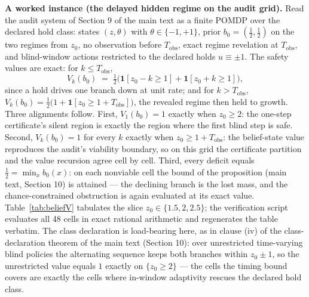 \documentclass[11pt]{article}
\theoremstyle{definition}
\begin{document}
\textbf{A worked instance (the delayed hidden regime on the audit grid).} Read the audit system of Section 9 of the main text as a finite POMDP over the declared hold class: states \((z,\theta)\) with \(\theta \in \{-1,+1\}\), prior \(b_{0} = (\tfrac{1}{2}, \tfrac{1}{2})\) on the two regimes from \(z_{0}\), no observation before \(T_{\mathrm{obs}}\), exact regime revelation at \(T_{\mathrm{obs}}\), and blind-window actions restricted to the declared holds \(u \equiv \pm 1\). The safety values are exact: for \(k \le T_{\mathrm{obs}}\),
\[
V_{k}(b_{0}) \;=\; \tfrac{1}{2}\bigl(\mathbf{1}[z_{0} - k \ge 1] + \mathbf{1}[z_{0} + k \ge 1]\bigr),
\]
since a hold drives one branch down at unit rate; and for \(k > T_{\mathrm{obs}}\),
\(V_{k}(b_{0}) = \tfrac{1}{2}\bigl(1 + \mathbf{1}[z_{0} \ge 1 + T_{\mathrm{obs}}]\bigr)\), the revealed regime then held to growth. Three alignments follow. First, \(V_{1}(b_{0}) = 1\) exactly when \(z_{0} \ge 2\): the one-step certificate's silent region is exactly the region where the first blind step is safe. Second, \(V_{k}(b_{0}) = 1\) for every \(k\) exactly when \(z_{0} \ge 1 + T_{\mathrm{obs}}\): the belief-state value reproduces the audit's viability boundary, so on this grid the certificate partition and the value recursion agree cell by cell. Third, every deficit equals \(\tfrac{1}{2} = \min_{x} b_{0}(x)\): on each nonviable cell the bound of the proposition (main text, Section 10) is attained --- the declining branch is the lost mass, and the chance-constrained obstruction is again evaluated at its exact value. Table~\ref{tab:beliefV} tabulates the slice \(z_{0} \in \{1.5, 2, 2.5\}\); the verification script evaluates all 48 cells in exact rational arithmetic and regenerates the table verbatim. The class declaration is load-bearing here, as in clause (iv) of the class-declaration theorem of the main text (Section 10): over unrestricted time-varying blind policies the alternating sequence keeps both branches within \(z_{0} \pm 1\), so the unrestricted value equals \(1\) exactly on \(\{z_{0} \ge 2\}\) --- the cells the timing bound covers are exactly the cells where in-window adaptivity rescues the declared hold class.
\end{document}
